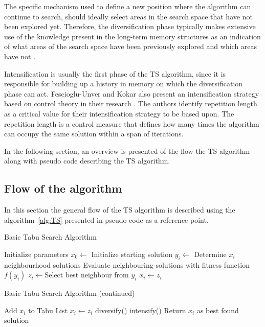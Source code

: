 The specific mechanism used to define a new position where the algorithm can continue to search, should ideally select areas in the search space that have not been explored yet. Therefore, the diversification phase typically makes extensive use of the knowledge present in the long-term memory structures as an indication of what areas of the search space have been previously explored and which areas have not \cite{TabuParameterization,TabuCrewSchedulingProblem,NonlinearGlobalTabu,SelfControllingReactiveTabu}.

Intensification is usually the first phase of the TS algorithm, since it is responsible for building up a history in memory on which the diversification phase can act. Fescioglu-Unver and Kokar also present an intensification strategy based on control theory in their research \cite{SelfControllingReactiveTabu}. The authors identify repetition length as a critical value for their intensification strategy to be based upon. The repetition length is a control measure that defines how many times the algorithm can occupy the same solution within a span of iterations.

In the following section, an overview is presented of the flow the TS algorithm along with pseudo code describing the TS algorithm.
\subsection{Flow of the algorithm}
In this section the general flow of the TS algorithm is described using the algorithm~\ref{alg:TS} presented in pseudo code as a reference point.
\begin{algorithm}[H]
\caption{Basic Tabu Search Algorithm\cite{TabuRCAProblem,TabuMontemanniSmith}}
\label{alg:TS}
	\begin{algorithmic}[1]
		\State Initialize parameters
		\State $x_0 \leftarrow$ Initialize starting solution
			\State $y_i \leftarrow$ Determine $x_i$ neighbourhood solutions 
			\State Evaluate neighbouring solutions with fitness function $f(y_i)$
			\State $z_i \leftarrow$Select best neighbour from $y_i$
					\State $x_i \leftarrow z_i$
				\EndIf
	\end{algorithmic}
\end{algorithm}

\begin{algorithm}[H]
\caption{Basic Tabu Search Algorithm (continued) \cite{TabuRCAProblem,TabuMontemanniSmith}}
\label{alg:TS2}
	\begin{algorithmic}[1]
			\Else
				\State Add $x_i$ to Tabu List
				\State $x_i \leftarrow z_i$
					\State diversify()
				\Else
					\State intensify()
				\EndIf
			\EndIf
		\EndWhile
		\State Return $x_i$ as best found solution
	\end{algorithmic}
\end{algorithm}


